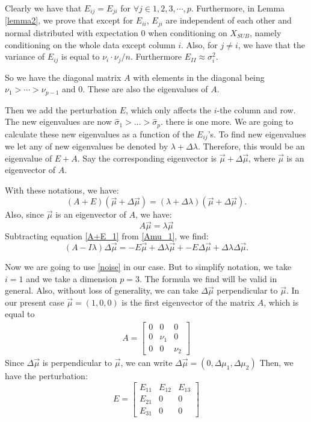 \documentclass[12pt]{amsart}
\theoremstyle{definition}
\numberwithin{equation}{section}
\numberwithin{equation}{section}
\theoremstyle{remark}
\numberwithin{equation}{section}
\begin{document}
Clearly we have that $E_{ij}=E_{ji}$ for $\forall j\in 1,2,3,\cdots,p$. Furthermore, in Lemma \ref{lemma2}, we prove that except for $E_{ii}$, $E_{ji}$ are independent of each other and normal distributed with expectation $0$ when conditioning on $X_{SUB}$, namely conditioning on the whole data except column $i$. Also, for $j\neq i$, we have that the variance of $E_{ij}$ is equal to $\nu_i\cdot\nu_j/n$. Furthermore $E_{II}\approx \sigma_i^2$.
	
So we have the diagonal matrix $A$ with elements in the diagonal being $\nu_1>\cdots>\nu_{p-1}$ and $0$. These are also the eigenvalues of $A$.

Then we add the perturbation $E$, which only affects the $i$-the column and row. The new eigenvalues are now $\hat{\sigma}_1>\ldots>\hat{\sigma}_p$. there is one more. We are going to calculate these new eigenvalues as a function of the $E_{ij}$'s. To find new eigenvalues we let any of new eigenvalues be denoted by $\lambda+\Delta\lambda$. Therefore, this would be an eigenvalue of $E+A$. Say the corresponding eigenvector is $\vec{\mu}+\Delta\vec{\mu}$, where $\vec{\mu}$ is an eigenvector of $A$.
	
With these notations, we have:
	\begin{equation}
	\label{A+E_1}
	(A+E)(\vec{\mu}+\Delta\vec{\mu})
	=(\lambda+\Delta\lambda)(\vec{\mu}+\Delta\vec{\mu}).
	\end{equation}
Also, since $\vec{\mu}$ is an eigenvector of $A$, we have:
	\begin{equation}
	\label{Amu_1}
	A\vec{\mu}=\lambda\vec{\mu}
	\end{equation}
Subtracting equation \ref{A+E_1} from \ref{Amu_1}, we find:
	\begin{equation}
	\label{noise}
	(A-I\lambda)\Delta\vec{\mu}=-E\vec{\mu}+\Delta\lambda\vec{\mu}+
	-E\Delta\vec{\mu}+\Delta\lambda\Delta\vec{\mu}.
	\end{equation}
	
Now we are going to use \ref{noise} in our case. But to simplify notation, we take $i=1$ and we take a dimension $p=3$. The formula we find will be valid in general. Also, without loss of generality, we can take $\Delta\vec{\mu}$ perpendicular to $\vec{\mu}$. In our present case $\vec{\mu}=(1,0,0)$ is the first eigenvector of the matrix $A$, which is equal to
	\begin{align*}
	A=\left[
	\begin{array}{ccccccccc}
	0&0&0\\
	0&\nu_1&0\\
	0&0&\nu_2
	\end{array}\right]
	\end{align*}
Since $\Delta\vec{\mu}$ is perpendicular to $\vec{\mu}$, we can write $\Delta\vec{\mu}=(0,\Delta\mu_1,\Delta\mu_2)$ Then, we have the perturbation:
	\begin{equation}
	\label{E}
	E=\left[
	\begin{array}{ccccccccc}
	E_{11}&E_{12}&E_{13}\\
	E_{21}&0&0\\
	E_{31}&0&0
	\end{array}\right]
	\end{equation}
	
\end{document}
